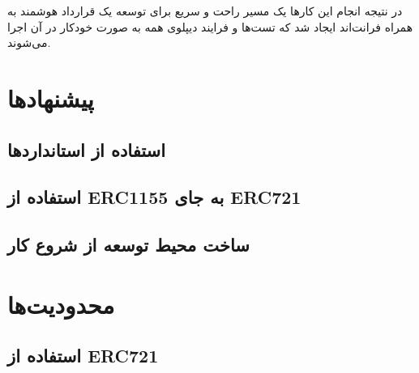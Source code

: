 در نتیجه انجام این کارها یک مسیر راحت و سریع برای توسعه یک قرارداد هوشمند به همراه فرانت‌اند ایجاد شد که تست‌ها و فرایند دیپلوی همه به صورت خودکار در آن اجرا می‌شوند.



\section{پیشنهادها}

\subsection{استفاده از استانداردها}

\subsection{استفاده از ERC1155 به جای ERC721}

\subsection{ساخت محیط توسعه از شروع کار}



\section{محدودیت‌ها}

\subsection{استفاده از ERC721}

\subsection{}

\subsection{}

